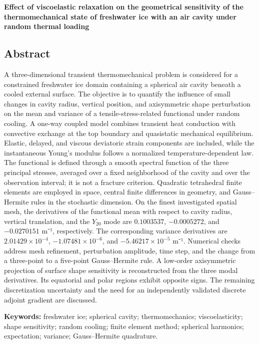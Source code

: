\documentclass[
]{article}
\begin{document}
\textbf{Effect of viscoelastic relaxation on the geometrical sensitivity
of the thermomechanical state of freshwater ice with an air cavity under
random thermal loading}

\subsection{Abstract}\label{abstract}

A three-dimensional transient thermomechanical problem is considered for
a constrained freshwater ice domain containing a spherical air cavity
beneath a cooled external surface. The objective is to quantify the
influence of small changes in cavity radius, vertical position, and
axisymmetric shape perturbation on the mean and variance of a
tensile-stress-related functional under random cooling. A one-way
coupled model combines transient heat conduction with convective
exchange at the top boundary and quasistatic mechanical equilibrium.
Elastic, delayed, and viscous deviatoric strain components are included,
while the instantaneous Young's modulus follows a normalized
temperature-dependent law. The functional is defined through a smooth
spectral function of the three principal stresses, averaged over a fixed
neighborhood of the cavity and over the observation interval; it is not
a fracture criterion. Quadratic tetrahedral finite elements are employed
in space, central finite differences in geometry, and Gauss--Hermite
rules in the stochastic dimension. On the finest investigated spatial
mesh, the derivatives of the functional mean with respect to cavity
radius, vertical translation, and the \(Y_{20}\) mode are \(0.1003537\),
\(-0.0005272\), and \(-0.0270151\) m⁻¹, respectively. The corresponding
variance derivatives are \(2.01429\times10^{-4}\),
\(-1.07481\times10^{-6}\), and \(-5.46217\times10^{-5}\) m⁻¹. Numerical
checks address mesh refinement, perturbation amplitude, time step, and
the change from a three-point to a five-point Gauss--Hermite rule. A
low-order axisymmetric projection of surface shape sensitivity is
reconstructed from the three modal derivatives. Its equatorial and polar
regions exhibit opposite signs. The remaining discretization uncertainty
and the need for an independently validated discrete adjoint gradient
are discussed.

\textbf{Keywords:} freshwater ice; spherical cavity; thermomechanics;
viscoelasticity; shape sensitivity; random cooling; finite element
method; spherical harmonics; expectation; variance; Gauss--Hermite
quadrature.
\end{document}
